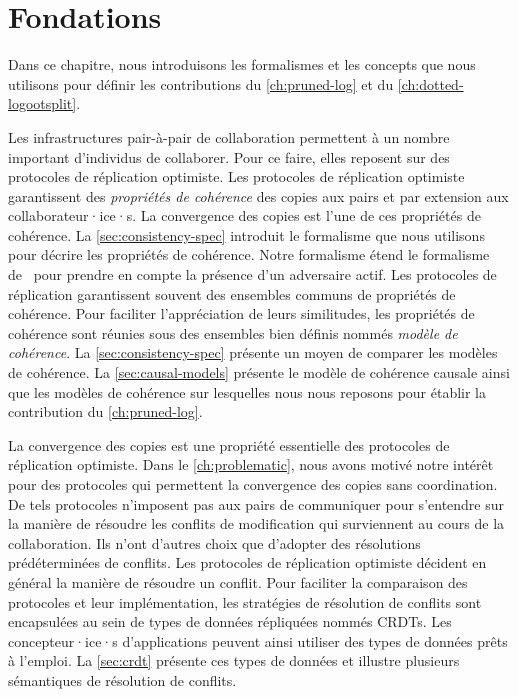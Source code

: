 
\chapter{Fondations}\label{ch:background}

\minitoc{}
\bigskip

Dans ce chapitre, nous introduisons les formalismes et les concepts que nous utilisons pour définir les contributions du \autoref{ch:pruned-log} et du \autoref{ch:dotted-logootsplit}.

Les infrastructures pair-à-pair de collaboration permettent à un nombre important d'individus de collaborer.
Pour ce faire, elles reposent sur des protocoles de réplication optimiste.
Les protocoles de réplication optimiste garantissent des \emph{propriétés de cohérence} des copies aux pairs et par extension aux collaborateur·ice·s.
La convergence des copies est l'une de ces propriétés de cohérence.
La \autoref{sec:consistency-spec} introduit le formalisme que nous utilisons pour décrire les propriétés de cohérence.
Notre formalisme étend le formalisme de~\textcite{burckhardt_eventualconsistency_2014} pour prendre en compte la présence d'un adversaire actif.
Les protocoles de réplication garantissent souvent des ensembles communs de propriétés de cohérence.
Pour faciliter l'appréciation de leurs similitudes, les propriétés de cohérence sont réunies sous des ensembles bien définis nommés \emph{modèle de cohérence}.
La \autoref{sec:consistency-spec} présente un moyen de comparer les modèles de cohérence.
La \autoref{sec:causal-models} présente le modèle de cohérence causale ainsi que les modèles de cohérence sur lesquelles nous nous reposons pour établir la contribution du \autoref{ch:pruned-log}.

La convergence des copies est une propriété essentielle des protocoles de réplication optimiste.
Dans le \autoref{ch:problematic}, nous avons motivé notre intérêt pour des protocoles qui permettent la convergence des copies sans coordination.
De tels protocoles n'imposent pas aux pairs de communiquer pour s'entendre sur la manière de résoudre les conflits de modification qui surviennent au cours de la collaboration.
Ils n'ont d'autres choix que d'adopter des résolutions prédéterminées de conflits.
Les protocoles de réplication optimiste décident en général la manière de résoudre un conflit.
Pour faciliter la comparaison des protocoles et leur implémentation, les stratégies de résolution de conflits sont encapsulées au sein de types de données répliquées nommés \acfp{CRDT}.
Les concepteur·ice·s d'applications peuvent ainsi utiliser des types de données prêts à l'emploi.
La \autoref{sec:crdt} présente ces types de données et illustre plusieurs sémantiques de résolution de conflits.

